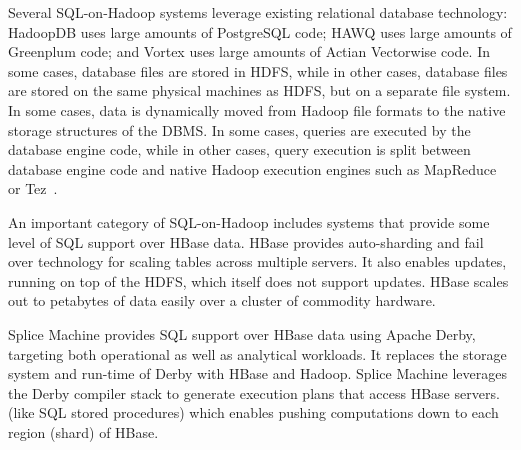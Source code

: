\documentclass{vldb}
\begin{document}
Several SQL-on-Hadoop systems leverage existing relational database technology:
HadoopDB \cite{hadoopdb} uses large amounts of PostgreSQL code; HAWQ \cite{hawq} uses large amounts of Greenplum code; and Vortex \cite{vortex} uses large amounts of Actian Vectorwise code. 
In some cases, database files are stored in HDFS, while in other cases, database files are stored on the same physical machines
as HDFS, but on a separate file system. In some cases, data is dynamically moved from Hadoop file formats to the native storage
structures of the DBMS.
In some cases, queries are executed by the database engine code, while in
other cases, query execution is split between database engine code and
native Hadoop execution engines such as MapReduce or Tez~\cite{split-execution}. 



An important category of SQL-on-Hadoop includes systems that provide some level of SQL support over HBase data. HBase provides auto-sharding and fail over technology for scaling tables across multiple servers. It also enables updates, running on top of the HDFS, which itself does not support updates. HBase scales out to petabytes of data easily over a cluster of commodity hardware. 

Splice Machine \cite{splice} provides SQL support over HBase data using Apache Derby, targeting both operational as well as analytical workloads. It replaces the storage system and run-time of Derby with HBase and Hadoop. Splice Machine leverages the Derby compiler stack to generate execution plans that access HBase servers.
(like SQL stored procedures) which enables pushing computations down to each region (shard) of HBase.
\end{document}
